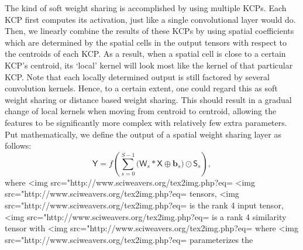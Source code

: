 The kind of soft weight sharing is accomplished by using multiple KCPs. Each KCP first computes 
its activation, just like a single convolutional layer would do. Then, we linearly combine the 
results of these KCPs by using spatial 
coefficients which are determined by the spatial cells in the output tensors with respect 
to the centroids of each KCP. As a result, when a spatial cell is close to a 
certain KCP's centroid, its `local' kernel will look most like the kernel of that 
particular KCP. Note that each locally determined output is still factored by 
several convolution kernels. Hence, to a certain extent, one could regard this as soft weight 
sharing or distance based weight sharing. This should result in a gradual change of local 
kernels when moving from centroid to centroid, allowing the features to be significantly 
more complex with relatively few extra parameters. Put mathematically, we define the output 
of a spatial weight sharing layer as follows:
\begin{equation}
\mathsf{Y} = f\left( \sum_{s=0}^{S-1} \bigg(\mathsf W_s  \ast \mathsf X \oplus \boldsymbol b_s\bigg) \odot \mathsf S_s \right),
\end{equation}
where <img src="http://www.sciweavers.org/tex2img.php?eq=%
<img src="http://www.sciweavers.org/tex2img.php?eq=%
tensors, 
<img src="http://www.sciweavers.org/tex2img.php?eq=%
is the rank 4 input tensor,
<img src="http://www.sciweavers.org/tex2img.php?eq=%
is a rank 4 similarity tensor 
with <img src="http://www.sciweavers.org/tex2img.php?eq=%
where <img src="http://www.sciweavers.org/tex2img.php?eq=%
parameterizes the 
